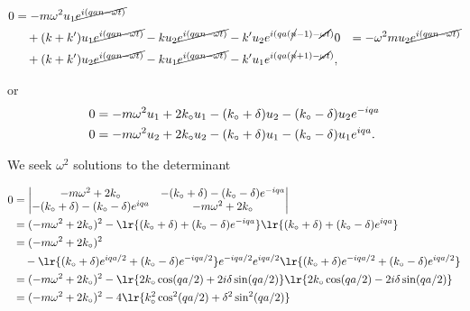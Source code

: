 {\begin{dmath}\label{eqn:condensedMatterProblemSet4Problem2:300}
\begin{aligned}
0 &= -m \omega^2
u_1 \cancel{e^{ i(q a n - \omega t) } } \\
&\quad +
( k + k')
u_1 \cancel{e^{ i(q a n - \omega t) } }
- k
u_2 \cancel{e^{ i(q a n - \omega t) } }
- k'
u_2 e^{ i(q a (\cancel{n} - 1) - \cancel{\omega t}) }
0 &= -\omega^2 m
u_2 \cancel{e^{ i(q a n - \omega t) } } \\
&\quad +
( k + k')
u_2 \cancel{e^{ i(q a n - \omega t) } }
- k
u_1 \cancel{e^{ i(q a n - \omega t) } }
- k'
u_1 e^{ i(q a (\cancel{n} + 1) - \cancel{\omega t}) },
\end{aligned}
\end{dmath}

or
\begin{equation}\label{eqn:condensedMatterProblemSet4Problem2:340}
\begin{aligned}
0 &= -m \omega^2
u_1
+
2 k_\circ
u_1
- (k_\circ + \delta)
u_2
- (k_\circ - \delta)
u_2 e^{ -i q a } \\
0 &= -m \omega^2
u_2
+
2 k_\circ
u_2
- (k_\circ + \delta)
u_1
- (k_\circ - \delta)
u_1 e^{ i q a }.
\end{aligned}
\end{equation}


We seek \(\omega^2\) solutions to the determinant

\begin{dmath}\label{eqn:condensedMatterProblemSet4Problem2:380}
\begin{aligned}
0 &=
\begin{vmatrix}
-m \omega^2 + 2 k_\nought &
- (k_\nought + \delta)
- (k_\nought - \delta) e^{ -i q a }
\\
- (k_\nought + \delta)
- (k_\nought - \delta) e^{ i q a }
&
-m \omega^2 + 2 k_\nought
\end{vmatrix} \\
&=
(-m \omega^2 + 2 k_\nought )^2
-
\lr{
  (k_\nought + \delta)
+ (k_\nought - \delta) e^{ -i q a }
}
\lr{
  (k_\nought + \delta)
+ (k_\nought - \delta) e^{ i q a }
} \\
&=
(-m \omega^2 + 2 k_\nought )^2 \\
&\quad -
\lr{
  (k_\nought + \delta)
e^{ i q a/2 }
+ (k_\nought - \delta)
e^{ -i q a/2 }
}
e^{ -i q a/2 }
e^{ i q a/2 }
\lr{
  (k_\nought + \delta) e^{ -i q a/2 }
+ (k_\nought - \delta) e^{ i q a/2 }
} \\
&=
(-m \omega^2 + 2 k_\nought )^2
-
\lr{
  2 k_\nought \cos (qa/2)
+ 2i \delta \sin (qa/2)
}
\lr{
  2 k_\nought \cos (qa/2)
- 2i \delta \sin (qa/2)
} \\
&=
(-m \omega^2 + 2 k_\nought )^2
-
4 \lr{
  k_\nought^2 \cos^2 (qa/2)
+ \delta^2 \sin^2 (qa/2)
}
\end{aligned}
\end{dmath}

}

